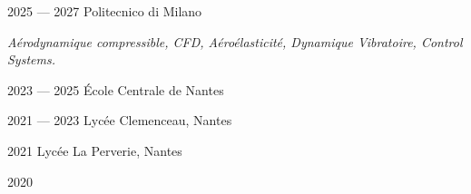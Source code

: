 

        {2025 — 2027}
        {Politecnico di Milano}%
        {%
          
           \small \textit{Aérodynamique compressible, CFD, Aéroélasticité, Dynamique Vibratoire, Control Systems.}
       
        }

        {2023 — 2025}
        {École Centrale de Nantes}
        {
        }

        {2021 — 2023}
        {Lycée Clemenceau, Nantes}
        {} 


        {2021}
        {Lycée La Perverie, Nantes}
        {%
        }

        {2020}
        {}

